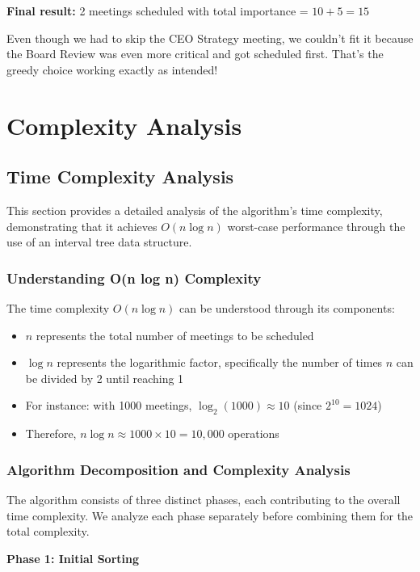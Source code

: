 \documentclass[conference]{IEEEtran}
\begin{document}
\textbf{Final result:} 2 meetings scheduled with total importance = $10 + 5 = 15$

Even though we had to skip the CEO Strategy meeting, we couldn't fit it because the Board Review was even more critical and got scheduled first. That's the greedy choice working exactly as intended!

\section{Complexity Analysis}

\subsection{Time Complexity Analysis}

This section provides a detailed analysis of the algorithm's time complexity, demonstrating that it achieves $O(n \log n)$ worst-case performance through the use of an interval tree data structure.

\subsubsection{Understanding O(n log n) Complexity}

The time complexity $O(n \log n)$ can be understood through its components:
\begin{itemize}
    \item $n$ represents the total number of meetings to be scheduled
    \item $\log n$ represents the logarithmic factor, specifically the number of times $n$ can be divided by 2 until reaching 1
    \item For instance: with 1000 meetings, $\log_2(1000) \approx 10$ (since $2^{10} = 1024$)
    \item Therefore, $n \log n \approx 1000 \times 10 = 10,000$ operations
\end{itemize}


\subsubsection{Algorithm Decomposition and Complexity Analysis}

The algorithm consists of three distinct phases, each contributing to the overall time complexity. We analyze each phase separately before combining them for the total complexity.

\textbf{Phase 1: Initial Sorting}
\end{document}
